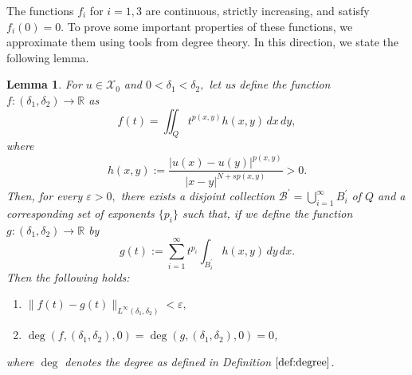 \documentclass[11pt]{article}
\newtheorem{lemma}{Lemma}[section] %
\newcommand{\X}{\mathcal{X}_{0}}
\newcommand{\Q}{\textit{Q}}
\newcommand{\lv}{\lVert}
\newcommand{\rv}{\rVert}
\begin{document}
The functions $f_i$
for $i = 1, 3$
are continuous, strictly increasing, and satisfy 
$f_i(0) = 0.$
To prove some important properties of these functions, 
we approximate them using tools from degree theory.
In this direction, we state the following lemma.

\begin{lemma}
For $u \in \X$
and $0 < \delta_1 < \delta_2,$
let us define the function
$f : (\delta_1, \delta_2) \to \mathbb{R}$
as
\begin{equation*}
f(t) = \iint_{\Q} t^{p(x,y)} h(x,y) \, dx \, dy,
\end{equation*}
where
\begin{equation*}
h(x,y) := 
\frac{|u(x) - u(y)|^{p(x,y)}}
{|x - y|^{N + s p(x,y)}} > 0.
\end{equation*}
Then, for every 
$\varepsilon > 0,$
there exists a disjoint collection 
$\mathcal{B}^{\prime} =  
\bigcup_{i=1}^{\infty} B_i^{\prime}$
of $\Q$
and a corresponding set of exponents 
$\{ p_i \}$
such that, if we define the function 
$g : (\delta_1, \delta_2) \to \mathbb{R}$
by
\begin{equation*} 
g(t) := \sum_{i=1}^\infty t^{p_i} 
\int_{B_i^{\prime}} h(x,y) \, dy \, dx.
\end{equation*}
Then the following holds:
\begin{enumerate}
    
\item $\lv f(t) - g(t) 
\rv_{L^{\infty}(\delta_1, \delta_2)} < \varepsilon,$
    
\item $\deg(f,(\delta_1, \delta_2), 0) 
= \deg(g,(\delta_1, \delta_2), 0) = 0 $,
\end{enumerate}
where $\deg$
denotes the degree as defined in
 Definition $\ref{def:degree}$.
\end{lemma}
\end{document}
